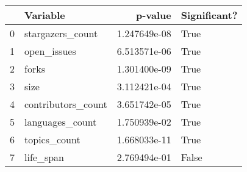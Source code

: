 \begin{tabular}{llrl}
\toprule
{} &            Variable &       p-value &  Significant? \\
\midrule
0 &    stargazers\_count &  1.247649e-08 &          True \\
1 &         open\_issues &  6.513571e-06 &          True \\
2 &               forks &  1.301400e-09 &          True \\
3 &                size &  3.112421e-04 &          True \\
4 &  contributors\_count &  3.651742e-05 &          True \\
5 &     languages\_count &  1.750939e-02 &          True \\
6 &        topics\_count &  1.668033e-11 &          True \\
7 &           life\_span &  2.769494e-01 &         False \\
\bottomrule
\end{tabular}
